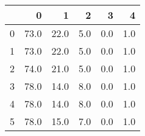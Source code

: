 \begin{tabular}{lrrrrr}
\toprule
{} &     0 &     1 &    2 &    3 &    4 \\
\midrule
0 &  73.0 &  22.0 &  5.0 &  0.0 &  1.0 \\
1 &  73.0 &  22.0 &  5.0 &  0.0 &  1.0 \\
2 &  74.0 &  21.0 &  5.0 &  0.0 &  1.0 \\
3 &  78.0 &  14.0 &  8.0 &  0.0 &  1.0 \\
4 &  78.0 &  14.0 &  8.0 &  0.0 &  1.0 \\
5 &  78.0 &  15.0 &  7.0 &  0.0 &  1.0 \\
\bottomrule
\end{tabular}
